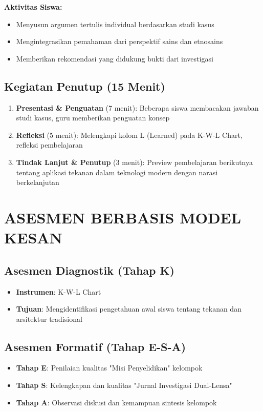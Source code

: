 \documentclass[12pt,a4paper]{article}
\begin{document}
\textbf{Aktivitas Siswa:}
\begin{itemize}
\item Menyusun argumen tertulis individual berdasarkan studi kasus
\item Mengintegrasikan pemahaman dari perspektif sains dan etnosains
\item Memberikan rekomendasi yang didukung bukti dari investigasi
\end{itemize}

\subsection{Kegiatan Penutup (15 Menit)}

\begin{enumerate}
\item \textbf{Presentasi \& Penguatan} (7 menit): Beberapa siswa membacakan jawaban studi kasus, guru memberikan penguatan konsep
\item \textbf{Refleksi} (5 menit): Melengkapi kolom L (Learned) pada K-W-L Chart, refleksi pembelajaran
\item \textbf{Tindak Lanjut \& Penutup} (3 menit): Preview pembelajaran berikutnya tentang aplikasi tekanan dalam teknologi modern dengan narasi berkelanjutan
\end{enumerate}

\section{ASESMEN BERBASIS MODEL KESAN}

\subsection{Asesmen Diagnostik (Tahap K)}
\begin{itemize}
\item \textbf{Instrumen}: K-W-L Chart
\item \textbf{Tujuan}: Mengidentifikasi pengetahuan awal siswa tentang tekanan dan arsitektur tradisional
\end{itemize}

\subsection{Asesmen Formatif (Tahap E-S-A)}
\begin{itemize}
\item \textbf{Tahap E}: Penilaian kualitas "Misi Penyelidikan" kelompok
\item \textbf{Tahap S}: Kelengkapan dan kualitas "Jurnal Investigasi Dual-Lensa"
\item \textbf{Tahap A}: Observasi diskusi dan kemampuan sintesis kelompok
\end{itemize}
\end{document}

